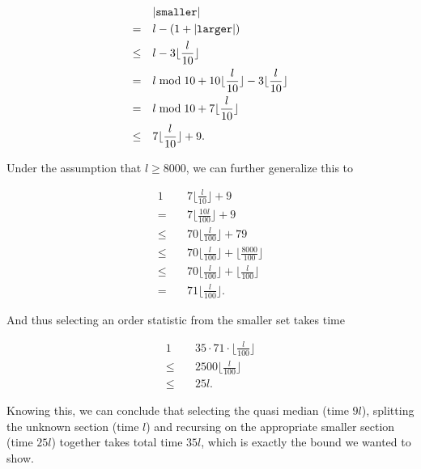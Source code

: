 \begin{alignat*}{1}
    &\quad \lvert\mathrm{\texttt{smaller}}\rvert \\
    =&\quad l - (1 + \lvert\mathrm{\texttt{larger}}\rvert) \\
    \leq&\quad l - 3 \lfloor \frac l {10} \rfloor \\
    =&\quad l \bmod 10 + 10 \lfloor \frac l {10} \rfloor - 3 \lfloor \frac l {10} \rfloor \\
    =&\quad l \bmod 10 + 7 \lfloor \frac l {10} \rfloor \\
    \leq&\quad 7 \lfloor \frac l {10} \rfloor + 9.
\end{alignat*}

Under the assumption that $l \geq 8000$, we can further generalize this to

\begin{alignat*}{1}
    &\quad 7 \lfloor \frac l {10} \rfloor + 9 \\
    =&\quad 7 \lfloor \frac {10l} {100} \rfloor + 9 \\
    \leq&\quad 70 \lfloor \frac {l} {100} \rfloor + 79 \\
    \leq&\quad 70 \lfloor \frac {l} {100} \rfloor + \lfloor \frac {8000} {100} \rfloor \\
    \leq&\quad 70 \lfloor \frac {l} {100} \rfloor + \lfloor \frac {l} {100} \rfloor \\
    =&\quad 71 \lfloor \frac {l} {100} \rfloor.
\end{alignat*}

And thus selecting an order statistic from the smaller set takes time

\begin{alignat*}{1}
    &\quad 35 \cdot 71 \cdot \lfloor \frac {l} {100} \rfloor \\
    \leq&\quad 2500 \lfloor \frac {l} {100} \rfloor \\
    \leq&\quad 25 l.
\end{alignat*}

Knowing this, we can conclude that selecting the quasi median (time $9l$), splitting the unknown section (time $l$) and recursing on the appropriate smaller section (time $25l$) together takes total time $35l$, which is exactly the bound we wanted to show.